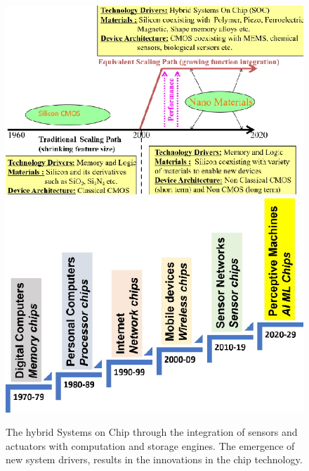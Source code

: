 \begin{figure}[H]
\centering
\includegraphics[scale=1.25]{src/Figures/chap1/chap1-fig07a.jpg}\qquad\qquad
\includegraphics[scale=1.05]{src/Figures/chap1/chap1-fig07b.jpg}
\caption{The hybrid Systems on Chip through the integration of sensors and actuators with computation and storage engines. The emergence of new system drivers, results in the innovations in the chip technology.}\label{chap1-fig7}
\end{figure}

\vskip -1.25cm

\hfill{}


